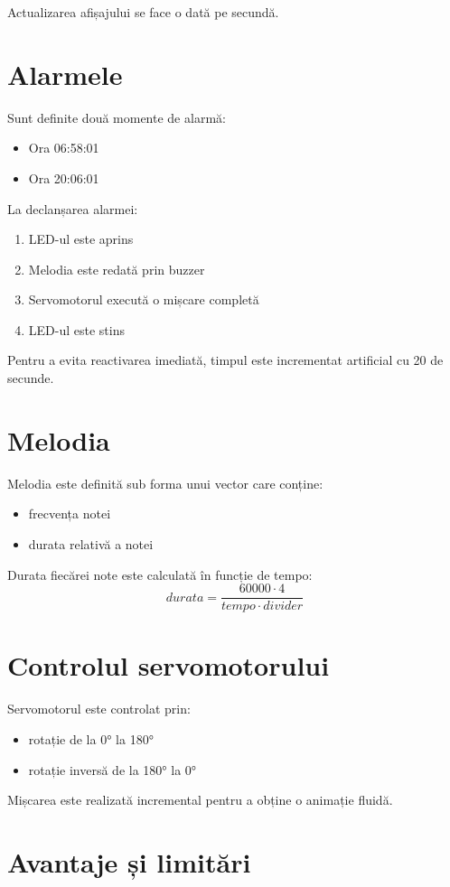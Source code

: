\documentclass[12pt,a4paper]{article}
\begin{document}
Actualizarea afișajului se face o dată pe secundă.

\section{Alarmele}
Sunt definite două momente de alarmă:
\begin{itemize}
    \item Ora 06:58:01
    \item Ora 20:06:01
\end{itemize}

La declanșarea alarmei:
\begin{enumerate}
    \item LED-ul este aprins
    \item Melodia este redată prin buzzer
    \item Servomotorul execută o mișcare completă
    \item LED-ul este stins
\end{enumerate}

Pentru a evita reactivarea imediată, timpul este incrementat artificial cu 20 de secunde.

\section{Melodia}
Melodia este definită sub forma unui vector care conține:
\begin{itemize}
    \item frecvența notei
    \item durata relativă a notei
\end{itemize}

Durata fiecărei note este calculată în funcție de tempo:
\[
durata = \frac{60000 \cdot 4}{tempo \cdot divider}
\]

\section{Controlul servomotorului}
Servomotorul este controlat prin:
\begin{itemize}
    \item rotație de la 0° la 180°
    \item rotație inversă de la 180° la 0°
\end{itemize}

Mișcarea este realizată incremental pentru a obține o animație fluidă.

\section{Avantaje și limitări}
\end{document}

